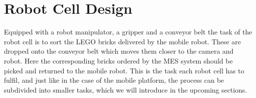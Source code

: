 \chapter{Robot Cell Design}\label{chap:robot_cell_chapter}
Equipped with a robot manipulator, a gripper and a conveyor belt the task of the robot cell is to sort the LEGO bricks delivered by the mobile robot. These are dropped onto the conveyor belt which moves them closer to the camera and robot. Here the corresponding bricks ordered by the MES system should be picked and returned to the mobile robot. This is the task each robot cell has to fulfil, and just like in the case of the mobile platform, the process can be subdivided into smaller tasks, which we will introduce in the upcoming sections.
















